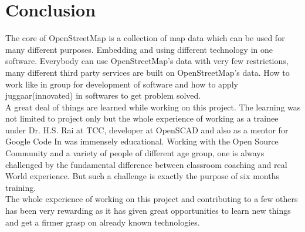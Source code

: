 \section{Conclusion}
The core of OpenStreetMap is a collection of map data which can be used for many different purposes. Embedding and using different technology in one software. Everybody can use OpenStreetMap's data with very few restrictions, many different third party services are built on OpenStreetMap's data. How to work like in group for development of software and how to apply juggaar(innovated) in softwares to get problem solved.\\
A great deal of things are learned while working on this project. The learning was not
limited to project only but the whole experience of working as a trainee under Dr. H.S. Rai
at TCC, developer at OpenSCAD and also as a mentor for Google Code In was immensely
educational. Working with the Open Source Community and a variety of people of different
age group, one is always challenged by the fundamental difference between classroom coaching
and real World experience. But such a challenge is exactly the purpose of six months training.\\
The whole experience of working on this project and contributing to a few others has been
very rewarding as it has given great opportunities to learn new things and get a firmer grasp on
already known technologies.\\\\
